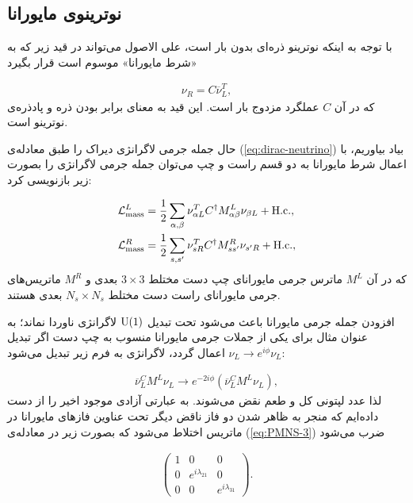 \documentclass[a4paper]{book}
\begin{document}
\subsection{نوترینوی مایورانا}
\label{sec:majorana}
با توجه به اینکه نوترینو ذره‌ای بدون بار است، علی الاصول می‌تواند در قید زیر که به «شرط مایورانا» موسوم است قرار بگیرد
\par
\vspace{-0.5cm}
{\footnotesize\begin{align}
	\nu_R=C\overline{\nu}_L^T,
	\label{eq:majorana-cond}
\end{align}}
که در آن {\footnotesize$C$} عملگرد مزدوج بار است. این قید به معنای برابر بودن ذره و پادذره‌ی نوترینو است.

حال جمله جرمی لاگرانژی دیراک را طبق معادله‌ی (\ref{eq:dirac-neutrino}) بیاد بیاوریم، با اعمال شرط مایورانا به دو قسم راست و چپ می‌توان جمله جرمی لاگرانژی را بصورت زیر بازنویسی کرد:
\par
\vspace{-0.5cm}
{\footnotesize\begin{align}
	\mathcal{L}^L_{\rm mass}&=\frac{1}{2}\sum_{\alpha,\beta} \nu_{\alpha L}^T C^{\dagger} M_{\alpha \beta}^L \nu_{\beta L} + {\rm H.c.},\\
	\mathcal{L}^R_{\rm mass}&=\frac{1}{2}\sum_{s, s^{\prime}} \nu_{sR}^T C^{\dagger} M_{ss^{\prime}}^R \nu_{s^{\prime}R}+{\rm H.c.},
	\label{eq:majorana-neutrino}
\end{align}}
که در آن {\footnotesize$M^L$} ماترس جرمی مایورانای چپ دست مختلط {\footnotesize$3 \times 3$} بعدی و {\footnotesize$M^R$} ماتریس‌های جرمی مایورانای راست دست مختلط {\footnotesize$N_s\times N_s$}‌ بعدی هستند.

افزودن جمله جرمی مایورانا باعث می‌شود تحت تبدیل {\footnotesize${\rm U}(1)$}
لاگرانژی ناوردا نماند؛ به عنوان مثال برای یکی از جملات جرمی مایورانا منسوب به چپ دست اگر تبدیل {\footnotesize$\nu_L \to e^{i\phi} \nu_L$} اعمال گردد، لاگرانژی به فرم زیر تبدیل می‌شود:
\par
\vspace{-0.5cm}
{\footnotesize\begin{align}
	\overline{\nu}_L^C M^L \nu_L \to e^{-2i\phi}\left(\overline{\nu}_L^C M^L \nu_L\right),
	\label{eq:Majorana-lepton-num-violation}
\end{align}}
لذا عدد لپتونی کل و طعم نقض می‌شوند.
به عبارتی آزادی موجود اخیر را از دست داده‌ایم که منجر به ظاهر شدن دو فاز ناقض  دیگر تحت عناوین فازهای مایورانا در ماتریس اختلاط  می‌شود که بصورت زیر در معادله‌ی (\ref{eq:PMNS-3}) ضرب می‌شود
\par
\vspace{-0.5cm}
{\footnotesize\begin{align}
	\begin{pmatrix}
		1&0&0\\
		0&e^{i\lambda_{21}}&0\\
		0&0&e^{i\lambda_{31}}
	\end{pmatrix}.
	\label{eq:Majorana-phases}
\end{align}}
\end{document}
